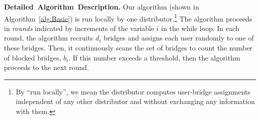 \documentclass[a4paper,UKenglish]{lipics-v2016}
\newcommand{\sfsize}{\fontsize{0.68\baselineskip}{0.68\baselineskip}\selectfont}
\newcommand{\sans}[1]{\textbf{\textsf{\sfsize \mbox{#1}}}}
\newcommand{\para}[1]{\vspace{0.55em} \noindent \sans{{\mbox{#1}}}}
\begin{document}



\para{Detailed Algorithm Description.}
Our algorithm (shown in Algorithm~\ref{alg:Basic}) is run locally by one distributor.\footnote{By ``run locally'', we mean the distributor computes user-bridge assignments independent of any other distributor and without exchanging any information with them.} 
The algorithm proceeds in \emph{rounds} indicated by increments of the variable $i$ in the while loop.
In each round, the algorithm recruits $d_i$ bridges and assigns each user randomly to one of these bridges. Then, it continuously scans the set of bridges to count the number of blocked bridges, $b_i$. If this number exceeds a threshold, then the algorithm proceeds to the next round. %
\end{document}
